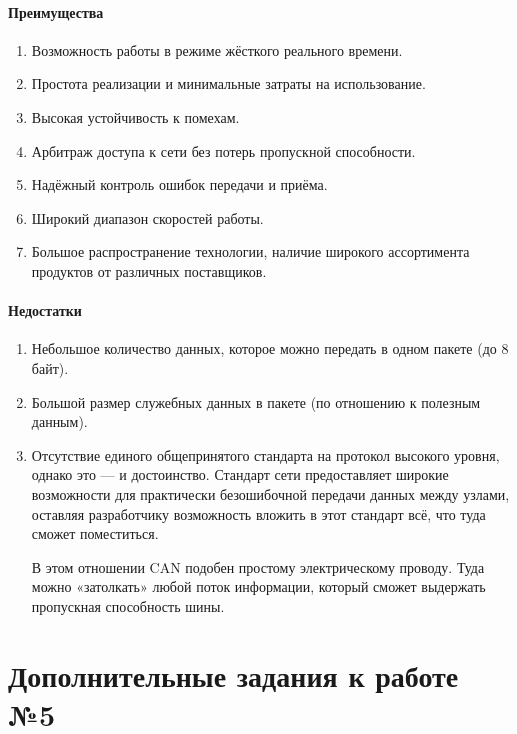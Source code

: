 \documentclass[a4paper,14pt]{extarticle}
\begin{document}
\begin{problem}
	\paragraph*{Преимущества}
	\begin{enumerate}
		\item Возможность работы в режиме жёсткого реального времени.
		\item Простота реализации и минимальные затраты на использование.
		\item Высокая устойчивость к помехам.
		\item Арбитраж доступа к сети без потерь пропускной способности.
		\item Надёжный контроль ошибок передачи и приёма.
		\item Широкий диапазон скоростей работы.
		\item Большое распространение технологии, наличие широкого ассортимента продуктов от различных поставщиков.
	\end{enumerate}

	\paragraph*{Недостатки}
	\begin{enumerate}
		\item Небольшое количество данных, которое можно передать в одном пакете (до 8 байт).
		\item Большой размер служебных данных в пакете (по отношению к полезным данным).
		\item Отсутствие единого общепринятого стандарта на протокол высокого уровня, однако это --- и достоинство. Стандарт сети предоставляет широкие возможности для практически безошибочной передачи данных между узлами, оставляя разработчику возможность вложить в этот стандарт всё, что туда сможет поместиться. 
		
		В этом отношении CAN подобен простому электрическому проводу. Туда можно «затолкать» любой поток информации, который сможет выдержать пропускная способность шины.
		
	\end{enumerate}
	
\end{problem}


\newpage

\section{Дополнительные задания к работе №5}
\end{document}
